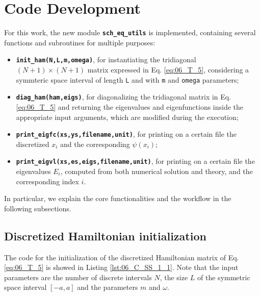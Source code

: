 \documentclass[pra, onecolumn, notitlepage, floats, 11pt]{revtex4-1}
\newcommand{\codebold}[2][cobalt]{\texttt{\bfseries {\color{#1}#2}}}
\newcommand{\code}[2][black]{\color{#1}\texttt{#2}}
\newcommand{\codefunctionbold}[2]{\texttt{\bfseries {\color{cobalt}#1}({\color{lava}#2})}}
\begin{document}
\section{Code Development}
For this work, the new module \codebold{sch\_eq\_utils} is implemented, containing several functions and subroutines for multiple purposes:
\begin{itemize}
    \item \codefunctionbold{init\_ham}{N,L,m,omega}, for instantiating the tridiagonal \( (N+1) \times (N+1) \) matrix expressed in Eq. \ref{eq:06_T_5}, considering a symmteric space interval of length \code{L} and with \code{m} and \code{omega} parameters;
    \item \codefunctionbold{diag\_ham}{ham,eigs}, for diagonalizing the tridiagonal matrix in Eq. \ref{eq:06_T_5} and returning the eigenvalues and eigenfunctions inside the appropriate input arguments, which are modified during the execution;
    \item \codefunctionbold{print\_eigfc}{xs,ys,filename,unit}, for printing on a certain file the discretized \( x_{i} \) and the corresponding \( \psi(x_{i}) \);
    \item \codefunctionbold{print\_eigvl}{xs,es,eigs,filename,unit}, for printing on a certain file the eigenvalues \( E_{i} \), computed from both numerical solution and theory, and the corresponding index \( i \).
\end{itemize}

In particular, we explain the core functionalities and the workflow in the following subsections.



\subsection{Discretized Hamiltonian initialization}
The code for the initialization of the discretized Hamiltonian matrix of Eq. \ref{eq:06_T_5} is showed in Listing \ref{lst:06_C_SS_1_1}. Note that the input parameters are the number of discrete intervals \( N \), the size \( L \) of the symmetric space interval \( [-a,a] \) and the parameters \( m \) and \( \omega \).
\end{document}
